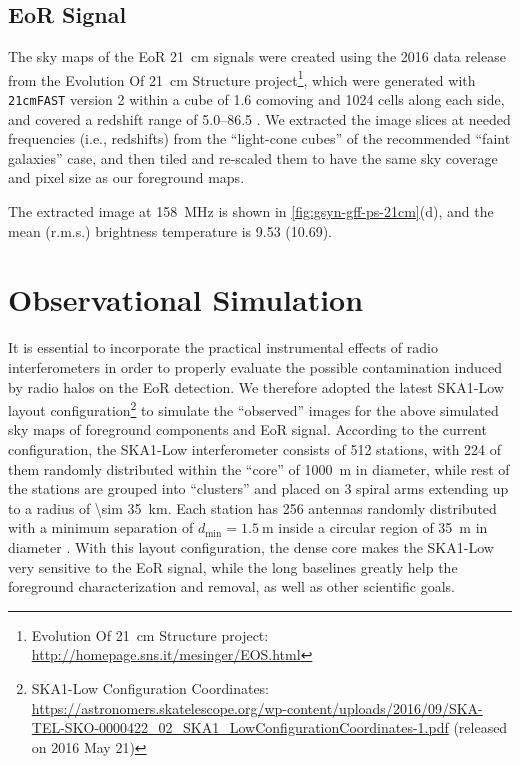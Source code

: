 \documentclass[modern]{aastex62}
\newcommand{\R}[1]{\mathrm{#1}}
\begin{document}
\subsection{EoR Signal}
\label{sec:eor-signal}

The sky maps of the EoR 21~cm signals were created using the 2016
data release from the Evolution Of 21~cm Structure project\footnote{%
  Evolution Of 21~cm Structure project:
  \url{http://homepage.sns.it/mesinger/EOS.html}},
which were generated with \texttt{21cmFAST} version 2 \citep{mesinger2011}
within a cube of 1.6 comoving \si{\Gpc} and 1024 cells along each side,
and covered a redshift range of \numrange{5.0}{86.5} \citep{mesinger2016}.
We extracted the image slices at needed frequencies (i.e., redshifts) from
the \enquote{light-cone cubes} of the recommended \enquote{faint galaxies}
case, and then tiled and re-scaled them to have the same sky coverage and
pixel size as our foreground maps.

The extracted image at \SI{158}{\MHz} is shown in
\autoref{fig:gsyn-gff-ps-21cm}(d),
and the mean (r.m.s.) brightness temperature is
\SI{9.53}{\mK} (\SI{10.69}{\mK}).


\section{Observational Simulation}
\label{sec:obs-simu}

It is essential to incorporate the practical instrumental effects of
radio interferometers in order to properly evaluate the possible
contamination induced by radio halos on the EoR detection.
We therefore adopted the latest SKA1-Low layout configuration\footnote{%
  SKA1-Low Configuration Coordinates:
  \url{https://astronomers.skatelescope.org/wp-content/uploads/2016/09/SKA-TEL-SKO-0000422_02_SKA1_LowConfigurationCoordinates-1.pdf}
  (released on 2016 May 21)
}
to simulate the \enquote{observed} images for the above simulated sky
maps of foreground components and EoR signal.
According to the current configuration,
the SKA1-Low interferometer consists of 512 stations, with 224 of them
randomly distributed within the \enquote{core} of \SI{1000}{\meter} in
diameter, while rest of the stations are grouped into \enquote{clusters}
and placed on 3 spiral arms extending up to a radius of
\SI{\sim 35}{\kilo\meter}.
Each station has 256 antennas randomly distributed with a minimum separation
of $d_{\R{min}} = \SI{1.5}{\meter}$ inside a circular region of
\SI{35}{\meter} in diameter \citep[e.g.,][]{mort2017}.
With this layout configuration, the dense core makes the SKA1-Low very
sensitive to the EoR signal, while the long baselines greatly help the
foreground characterization and removal, as well as other scientific goals.
\end{document}
